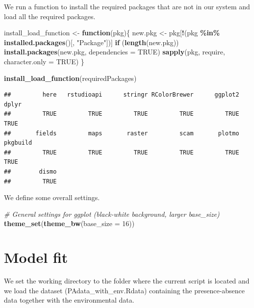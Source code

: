 \documentclass[
]{book}
\newenvironment{Shaded}{\begin{snugshade}}{\end{snugshade}}
\newcommand{\AttributeTok}[1]{\textcolor[rgb]{0.13,0.29,0.53}{#1}}
\newcommand{\CommentTok}[1]{\textcolor[rgb]{0.56,0.35,0.01}{\textit{#1}}}
\newcommand{\ConstantTok}[1]{\textcolor[rgb]{0.56,0.35,0.01}{#1}}
\newcommand{\ControlFlowTok}[1]{\textcolor[rgb]{0.13,0.29,0.53}{\textbf{#1}}}
\newcommand{\DecValTok}[1]{\textcolor[rgb]{0.00,0.00,0.81}{#1}}
\newcommand{\FunctionTok}[1]{\textcolor[rgb]{0.13,0.29,0.53}{\textbf{#1}}}
\newcommand{\NormalTok}[1]{#1}
\newcommand{\OtherTok}[1]{\textcolor[rgb]{0.56,0.35,0.01}{#1}}
\newcommand{\SpecialCharTok}[1]{\textcolor[rgb]{0.81,0.36,0.00}{\textbf{#1}}}
\newcommand{\StringTok}[1]{\textcolor[rgb]{0.31,0.60,0.02}{#1}}
\begin{document}
We run a function to install the required packages that are not in our system and load all the required packages.

\begin{Shaded}
\begin{Highlighting}[]
\NormalTok{install\_load\_function }\OtherTok{\textless{}{-}} \ControlFlowTok{function}\NormalTok{(pkg)\{}
\NormalTok{  new.pkg }\OtherTok{\textless{}{-}}\NormalTok{ pkg[}\SpecialCharTok{!}\NormalTok{(pkg }\SpecialCharTok{\%in\%} \FunctionTok{installed.packages}\NormalTok{()[, }\StringTok{"Package"}\NormalTok{])]}
  \ControlFlowTok{if}\NormalTok{ (}\FunctionTok{length}\NormalTok{(new.pkg))}
    \FunctionTok{install.packages}\NormalTok{(new.pkg, }\AttributeTok{dependencies =} \ConstantTok{TRUE}\NormalTok{)}
  \FunctionTok{sapply}\NormalTok{(pkg, require, }\AttributeTok{character.only =} \ConstantTok{TRUE}\NormalTok{)}
\NormalTok{\}}

\FunctionTok{install\_load\_function}\NormalTok{(requiredPackages)}
\end{Highlighting}
\end{Shaded}

\begin{verbatim}
##         here   rstudioapi      stringr RColorBrewer      ggplot2        dplyr 
##         TRUE         TRUE         TRUE         TRUE         TRUE         TRUE 
##       fields         maps       raster         scam       plotmo     pkgbuild 
##         TRUE         TRUE         TRUE         TRUE         TRUE         TRUE 
##        dismo 
##         TRUE
\end{verbatim}

We define some overall settings.

\begin{Shaded}
\begin{Highlighting}[]
\CommentTok{\# General settings for ggplot (black{-}white background, larger base\_size)}
\FunctionTok{theme\_set}\NormalTok{(}\FunctionTok{theme\_bw}\NormalTok{(}\AttributeTok{base\_size =} \DecValTok{16}\NormalTok{))}
\end{Highlighting}
\end{Shaded}

\section{Model fit}\label{model-fit}

We set the working directory to the folder where the current script is located and we load the dataset (PAdata\_with\_env.Rdata) containing the presence-absence data together with the environmental data.
\end{document}
